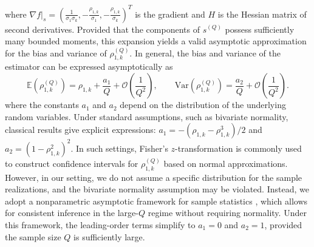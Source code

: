 %
where $\nabla f|_{s} = (\frac{1}{\sigma_1\sigma_k},-\frac{\rho_{1,k}}{\sigma_1},-\frac{\rho_{1,k}}{\sigma_k} )^T$ is the gradient and $H$ is the Hessian matrix of second derivatives. Provided that the components of $s^{(Q)}$ possess sufficiently many bounded moments, this expansion yields a valid asymptotic approximation for the bias and variance of $\rho_{1,k}^{(Q)}$. In general, the bias and variance of the estimator can be expressed asymptotically as
%
\begin{equation*}
\label{eq:Expectation_var_rho}
    \mathbb{E}\left(\rho_{1,k}^{(Q)}\right) =\rho_{1,k}+\frac{a_1}{Q} + \mathcal{O}\left(\frac 1 {Q^2}\right),\qquad \text{Var}\left(\rho_{1,k}^{(Q)}\right)= \frac{a_2}{Q} + \mathcal{O}\left(\frac{1}{Q^2}\right).
\end{equation*}
%
where the constants $a_1$ and $a_2$ depend on the distribution of the underlying random variables. Under standard assumptions, such as bivariate normality, classical results \cite{Fi:1915, Ha:2007, Ri:1932, So:1913} give explicit expressions: $a_1 = -(\rho_{1,k} - \rho_{1,k}^3)/2$ and $a_2 = (1 - \rho_{1,k}^2)^2$. In such settings, Fisher’s $z$-transformation \cite{Fi:1915} is commonly used to construct confidence intervals for $\rho_{1,k}^{(Q)}$ based on normal approximations. However, in our setting, we do not assume a specific distribution for the sample realizations, and the bivariate normality assumption may be violated. Instead, we adopt a nonparametric asymptotic framework for sample statistics \cite{Og:2006, Pi:1937}, which allows for consistent inference in the large-$Q$ regime without requiring normality. Under this framework, the leading-order terms simplify to $a_1 = 0$ and $a_2 = 1$, provided the sample size $Q$ is sufficiently large.

